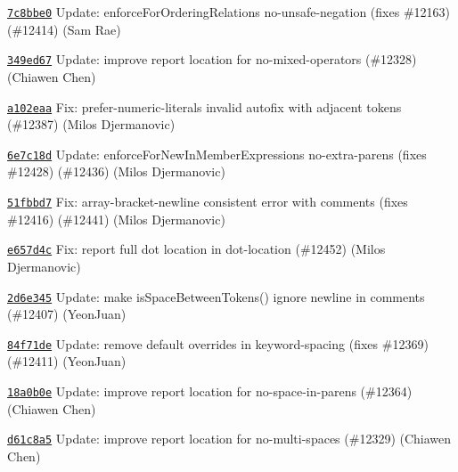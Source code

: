 \begin{DoxyItemize}
\item \href{https://github.com/eslint/eslint/commit/7c8bbe0391944e1f92e083a04715bf4b3fe6be5d}{\texttt{ {\ttfamily 7c8bbe0}}} Update\+: enforce\+For\+Ordering\+Relations no-\/unsafe-\/negation (fixes \#12163) (\#12414) (Sam Rae)
\item \href{https://github.com/eslint/eslint/commit/349ed6700e1155384597e1e6035550a96cb8a42d}{\texttt{ {\ttfamily 349ed67}}} Update\+: improve report location for no-\/mixed-\/operators (\#12328) (Chiawen Chen)
\item \href{https://github.com/eslint/eslint/commit/a102eaa9ac19e1c6d92f79a4033e9048cfb64c0d}{\texttt{ {\ttfamily a102eaa}}} Fix\+: prefer-\/numeric-\/literals invalid autofix with adjacent tokens (\#12387) (Milos Djermanovic)
\item \href{https://github.com/eslint/eslint/commit/6e7c18ddb30b32ee5b2e842cc8258aa7aebb7445}{\texttt{ {\ttfamily 6e7c18d}}} Update\+: enforce\+For\+New\+In\+Member\+Expressions no-\/extra-\/parens (fixes \#12428) (\#12436) (Milos Djermanovic)
\item \href{https://github.com/eslint/eslint/commit/51fbbd78f98f223d17071650f5117d07f60dadc2}{\texttt{ {\ttfamily 51fbbd7}}} Fix\+: array-\/bracket-\/newline consistent error with comments (fixes \#12416) (\#12441) (Milos Djermanovic)
\item \href{https://github.com/eslint/eslint/commit/e657d4ccb9f3dd5cacceaaa40ffe24ac29a1349a}{\texttt{ {\ttfamily e657d4c}}} Fix\+: report full dot location in dot-\/location (\#12452) (Milos Djermanovic)
\item \href{https://github.com/eslint/eslint/commit/2d6e345e3c2626b0f2252f22cfaffdf53ea0871a}{\texttt{ {\ttfamily 2d6e345}}} Update\+: make is\+Space\+Between\+Tokens() ignore newline in comments (\#12407) (Yeon\+Juan)
\item \href{https://github.com/eslint/eslint/commit/84f71de0e686e0fe37b83d6728ce1825caaa44fb}{\texttt{ {\ttfamily 84f71de}}} Update\+: remove default overrides in keyword-\/spacing (fixes \#12369) (\#12411) (Yeon\+Juan)
\item \href{https://github.com/eslint/eslint/commit/18a0b0e3df927428a22b5b5295f9faee4bd57246}{\texttt{ {\ttfamily 18a0b0e}}} Update\+: improve report location for no-\/space-\/in-\/parens (\#12364) (Chiawen Chen)
\item \href{https://github.com/eslint/eslint/commit/d61c8a5a75447a36276f2d4f84afb3e1129618da}{\texttt{ {\ttfamily d61c8a5}}} Update\+: improve report location for no-\/multi-\/spaces (\#12329) (Chiawen Chen)

\end{DoxyItemize}
